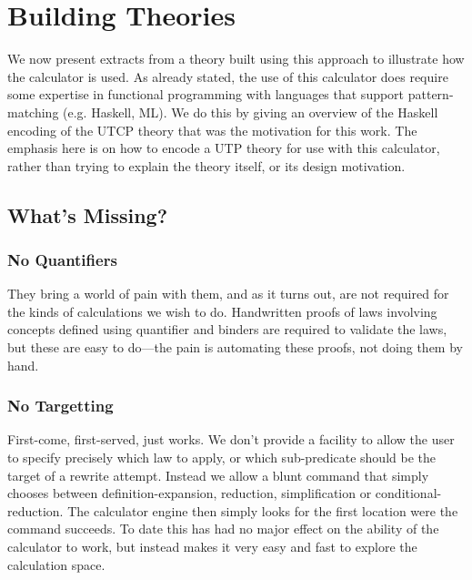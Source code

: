 \section{Building Theories}\label{sec:Theorising}


We now present extracts from a theory built using this
approach to illustrate how the calculator is used.
As already stated,
the use of this calculator does require some expertise
in functional programming with languages that support
pattern-matching (e.g. Haskell, ML).
We do this by giving an overview of the Haskell encoding
of the UTCP theory
that was the motivation for this work.
The emphasis here is on how to encode a UTP theory for use with this
calculator,
rather than trying to explain the theory itself, or its design motivation.



\subsection{What's Missing?}

\subsubsection{No Quantifiers}\label{ssec:no-quant}

    They bring a world of pain with them,
    and as it turns out, are not required
    for the kinds of calculations we wish to do.
    Handwritten proofs of laws involving concepts
    defined using quantifier and binders
    are required to validate the laws,
    but these are easy to do---the pain is automating these proofs,
    not doing them by hand.

\subsubsection{No Targetting}\label{ssec:no-target}

First-come, first-served, just works.
We don't provide a facility
to allow the user to specify
precisely which law to apply,
or which sub-predicate should be the target of a rewrite attempt.
Instead we allow a blunt command that simply chooses between
definition-expansion, reduction, simplification or conditional-reduction.
The calculator engine then simply looks for the first location
were the command succeeds.
To date this has had no major effect on the ability of the calculator
to work, but instead makes it very easy and fast to explore the calculation space.
